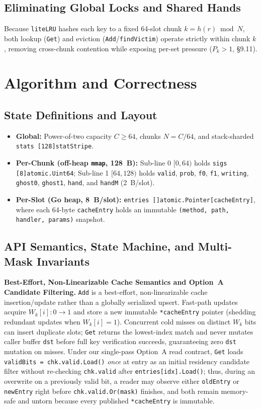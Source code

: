 \documentclass[11pt,a4paper]{article}
\begin{document}
\subsection{Eliminating Global Locks and Shared Hands}

Because \texttt{liteLRU} hashes each key to a fixed 64-slot chunk $k = h(r) \bmod N$, both lookup (\texttt{Get}) and eviction (\texttt{Add}/\texttt{findVictim}) operate strictly within chunk $k$, removing cross-chunk contention while exposing per-set pressure ($P_k > 1$, \S 9.11).

\section{Algorithm and Correctness}

\subsection{State Definitions and Layout}
\begin{itemize}
    \item \textbf{Global:} Power-of-two capacity $C \ge 64$, chunks $N = C/64$, and stack-sharded \texttt{stats [128]statStripe}.
    \item \textbf{Per-Chunk (off-heap \texttt{mmap}, 128~B):} Sub-line 0 $[0,64)$ holds \texttt{sigs [8]atomic.Uint64}; Sub-line 1 $[64,128)$ holds \texttt{valid}, \texttt{prob}, \texttt{f0}, \texttt{f1}, \texttt{writing}, \texttt{ghost0}, \texttt{ghost1}, \texttt{hand}, and \texttt{handM} (2~B/slot).
    \item \textbf{Per-Slot (Go heap, 8~B/slot):} \texttt{entries []atomic.Pointer[cacheEntry]}, where each 64-byte \texttt{cacheEntry} holds an immutable \texttt{(method, path, handler, params)} snapshot.
\end{itemize}

\subsection{API Semantics, State Machine, and Multi-Mask Invariants}
\textbf{Best-Effort, Non-Linearizable Cache Semantics and Option~A Candidate Filtering.} \texttt{Add} is a best-effort, non-linearizable cache insertion/update rather than a globally serialized upsert. Fast-path updates acquire $W_k[i]: 0 \to 1$ and store a new immutable \texttt{*cacheEntry} pointer (shedding redundant updates when $W_k[i]=1$). Concurrent cold misses on distinct $W_k$ bits can insert duplicate slots; \texttt{Get} returns the lowest-index match and never mutates caller buffer \texttt{dst} before full key verification succeeds, guaranteeing zero \texttt{dst} mutation on misses. Under our single-pass Option~A read contract, \texttt{Get} loads \texttt{validBits = chk.valid.Load()} \textit{once} at entry as an initial residency candidate filter without re-checking \texttt{chk.valid} after \texttt{entries[idx].Load()}; thus, during an overwrite on a previously valid bit, a reader may observe either \texttt{oldEntry} or \texttt{newEntry} right before \texttt{chk.valid.Or(mask)} finishes, and both remain memory-safe and untorn because every published \texttt{*cacheEntry} is immutable.
\end{document}
